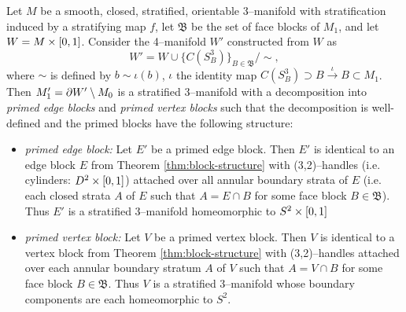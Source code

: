 \begin{theorem}
	\label{thm:primed-block-structure}
	Let $M$ be a smooth, closed, stratified, orientable 3--manifold with stratification induced by a stratifying map $f$, let $\mathfrak{B}$ be the set of face blocks of $M_1$, and let $W=M\times[0,1]$.
	Consider the 4--manifold $W'$ constructed from $W$ as
	\[
		W' = W\cup\{C(S_B^3)\}_{B\in \mathfrak{B}} / \sim,
	\]
	where $\sim$ is defined by $b\sim \iota(b)$, $\iota$ the identity map $C(S_B^3)\supset B\overset{\iota}{\to} B\subset M_1$.
	Then $M_1'=\partial W'\setminus M_0$ is a stratified 3--manifold with a decomposition into \emph{primed edge blocks} and \emph{primed vertex blocks} such that the decomposition is well-defined and the primed blocks have the following structure:
	\begin{itemize}
		\item \emph{primed edge block:}
		Let $E'$ be a primed edge block.
		Then $E'$ is identical to an edge block $E$ from Theorem \ref{thm:block-structure} with (3,2)--handles (i.e. cylinders: $D^2\times[0,1]$) attached over all annular boundary strata of $E$ (i.e. each closed strata $A$ of $E$ such that $A=E\cap B$ for some face block $B\in\mathfrak{B}$).
		Thus $E'$ is a stratified 3--manifold homeomorphic to $S^2\times[0,1]$
		
		\item \emph{primed vertex block:}
		Let $V$ be a primed vertex block.
		Then $V$ is identical to a vertex block from Theorem \ref{thm:block-structure} with (3,2)--handles attached over each annular boundary stratum $A$ of $V$ such that $A=V\cap B$ for some face block $B\in\mathfrak{B}$.
		Thus $V$ is a stratified 3--manifold whose boundary components are each homeomorphic to $S^2$.
	\end{itemize}
\end{theorem}


